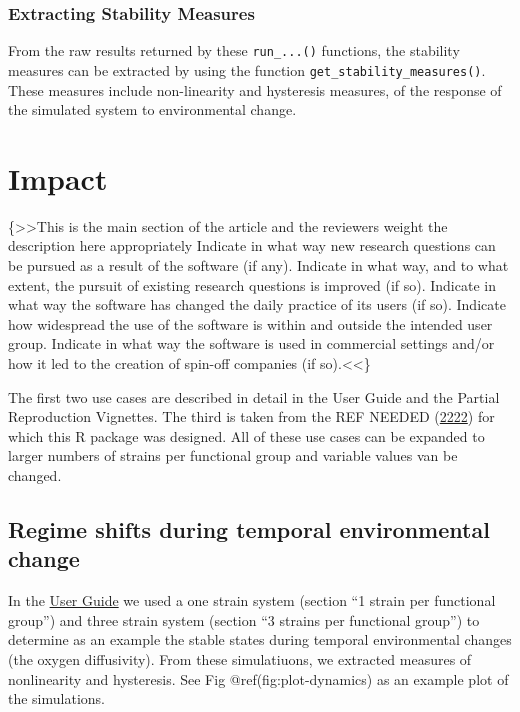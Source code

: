 \documentclass[]{elsarticle} %
\begin{document}
\hypertarget{extracting-stability-measures}{%
\subsubsection{Extracting Stability
Measures}\label{extracting-stability-measures}}

From the raw results returned by these \texttt{run\_...()} functions,
the stability measures can be extracted by using the function
\texttt{get\_stability\_measures()}. These measures include
non-linearity and hysteresis measures, of the response of the simulated
system to environmental change.

\hypertarget{impact}{%
\section{Impact}\label{impact}}

\{\textgreater\textgreater This is the main section of the article and
the reviewers weight the description here appropriately Indicate in what
way new research questions can be pursued as a result of the software
(if any). Indicate in what way, and to what extent, the pursuit of
existing research questions is improved (if so). Indicate in what way
the software has changed the daily practice of its users (if so).
Indicate how widespread the use of the software is within and outside
the intended user group. Indicate in what way the software is used in
commercial settings and/or how it led to the creation of spin-off
companies (if so).\textless\textless\}

The first two use cases are described in detail in the User Guide and
the Partial Reproduction Vignettes. The third is taken from the REF
NEEDED (\protect\hyperlink{ref-REF_NEEDED}{2222}) for which this R
package was designed. All of these use cases can be expanded to larger
numbers of strains per functional group and variable values van be
changed.

\hypertarget{regime-shifts-during-temporal-environmental-change}{%
\subsection{Regime shifts during temporal environmental
change}\label{regime-shifts-during-temporal-environmental-change}}

In the \href{LINK_NEEDED}{User Guide} we used a one strain system
(section ``1 strain per functional group'') and three strain system
(section ``3 strains per functional group'') to determine as an example
the stable states during temporal environmental changes (the oxygen
diffusivity). From these simulatiuons, we extracted measures of
nonlinearity and hysteresis. See Fig @ref(fig:plot-dynamics) as an
example plot of the simulations.
\end{document}
